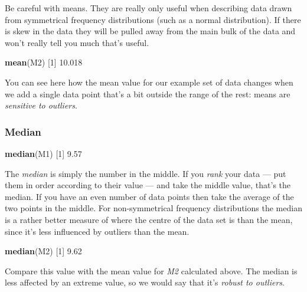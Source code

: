 \documentclass[
]{book}
\newenvironment{Shaded}{\begin{snugshade}}{\end{snugshade}}
\newcommand{\DecValTok}[1]{\textcolor[rgb]{0.00,0.00,0.81}{#1}}
\newcommand{\FloatTok}[1]{\textcolor[rgb]{0.00,0.00,0.81}{#1}}
\newcommand{\KeywordTok}[1]{\textcolor[rgb]{0.13,0.29,0.53}{\textbf{#1}}}
\newcommand{\NormalTok}[1]{#1}
\begin{document}
Be careful with means. They are really only useful when describing data drawn from symmetrical frequency distributions (such as a normal distribution). If there is skew in the data they will be pulled away from the main bulk of the data and won't really tell you much that's useful.

\begin{Shaded}
\begin{Highlighting}[]
\KeywordTok{mean}\NormalTok{(M2)}
\NormalTok{[}\DecValTok{1}\NormalTok{] }\FloatTok{10.018}
\end{Highlighting}
\end{Shaded}

You can see here how the mean value for our example set of data changes when we add a single data point that's a bit outside the range of the rest: means are \emph{sensitive to outliers}.

\hypertarget{median}{%
\subsubsection{Median}\label{median}}

\begin{Shaded}
\begin{Highlighting}[]
\KeywordTok{median}\NormalTok{(M1)}
\NormalTok{[}\DecValTok{1}\NormalTok{] }\FloatTok{9.57}
\end{Highlighting}
\end{Shaded}

The \emph{median} is simply the number in the middle. If you \emph{rank} your data --- put them in order according to their value --- and take the middle value, that's the median. If you have an even number of data points then take the average of the two points in the middle. For non-symmetrical frequency distributions the median is a rather better measure of where the centre of the data set is than the mean, since it's less influenced by outliers than the mean.

\begin{Shaded}
\begin{Highlighting}[]
\KeywordTok{median}\NormalTok{(M2)}
\NormalTok{[}\DecValTok{1}\NormalTok{] }\FloatTok{9.62}
\end{Highlighting}
\end{Shaded}

Compare this value with the mean value for \emph{M2} calculated above. The median is less affected by an extreme value, so we would say that it's \emph{robust to outliers}.
\end{document}
